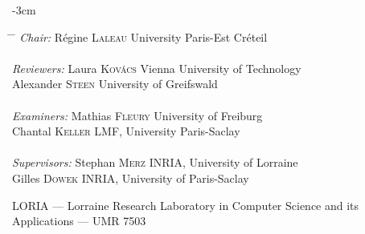 \begin{titlepage}
\begin{addmargin}[-1cm]{-3cm}
    \begin{center}
    \vspace{0.8em}
    \begin{tabbing}
    \hspace{3cm} \= \hspace{5cm} \= \kill
    \textit{Chair:} \> Régine \textsc{Laleau} \> University Paris-Est Créteil \\
    \\
    \textit{Reviewers:} \> Laura \textsc{Kovács} \> Vienna University of Technology \\
    \> Alexander \textsc{Steen} \> University of Greifswald \\
    \\
    \textit{Examiners:} \> Mathias \textsc{Fleury} \> University of Freiburg \\
    \> Chantal \textsc{Keller} \> LMF, University Paris-Saclay \\
    \\
    \textit{Supervisors:} \> Stephan \textsc{Merz} \> INRIA, University of Lorraine \\
    \> Gilles \textsc{Dowek} \> INRIA, University of Paris-Saclay \\
    \end{tabbing}
    \end{center}

    \vfill

    \begin{center}
    \small LORIA --- Lorraine Research Laboratory in Computer Science and its Applications --- UMR 7503
    \end{center}

    \end{addmargin}
\end{titlepage}
